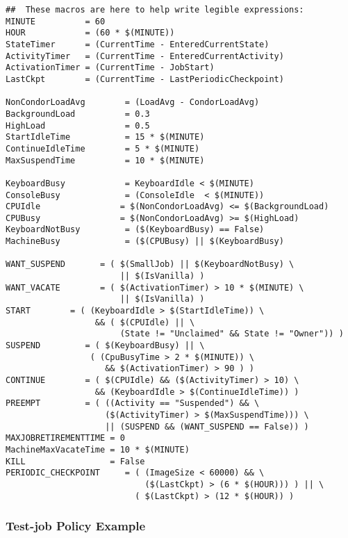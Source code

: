 \begin{verbatim}
##  These macros are here to help write legible expressions:
MINUTE          = 60
HOUR            = (60 * $(MINUTE))
StateTimer      = (CurrentTime - EnteredCurrentState)
ActivityTimer   = (CurrentTime - EnteredCurrentActivity)
ActivationTimer = (CurrentTime - JobStart)
LastCkpt        = (CurrentTime - LastPeriodicCheckpoint)

NonCondorLoadAvg        = (LoadAvg - CondorLoadAvg)
BackgroundLoad          = 0.3
HighLoad                = 0.5
StartIdleTime           = 15 * $(MINUTE)
ContinueIdleTime        = 5 * $(MINUTE)
MaxSuspendTime          = 10 * $(MINUTE)

KeyboardBusy            = KeyboardIdle < $(MINUTE)
ConsoleBusy             = (ConsoleIdle  < $(MINUTE))
CPUIdle                = $(NonCondorLoadAvg) <= $(BackgroundLoad)
CPUBusy                = $(NonCondorLoadAvg) >= $(HighLoad)
KeyboardNotBusy         = ($(KeyboardBusy) == False)
MachineBusy             = ($(CPUBusy) || $(KeyboardBusy)

WANT_SUSPEND       = ( $(SmallJob) || $(KeyboardNotBusy) \
                       || $(IsVanilla) )
WANT_VACATE        = ( $(ActivationTimer) > 10 * $(MINUTE) \
                       || $(IsVanilla) )
START        = ( (KeyboardIdle > $(StartIdleTime)) \
                  && ( $(CPUIdle) || \
                       (State != "Unclaimed" && State != "Owner")) )
SUSPEND         = ( $(KeyboardBusy) || \
                 ( (CpuBusyTime > 2 * $(MINUTE)) \
                    && $(ActivationTimer) > 90 ) )
CONTINUE        = ( $(CPUIdle) && ($(ActivityTimer) > 10) \
                  && (KeyboardIdle > $(ContinueIdleTime)) )
PREEMPT	        = ( ((Activity == "Suspended") && \
                    ($(ActivityTimer) > $(MaxSuspendTime))) \
                    || (SUSPEND && (WANT_SUSPEND == False)) )
MAXJOBRETIREMENTTIME = 0
MachineMaxVacateTime = 10 * $(MINUTE)
KILL                 = False
PERIODIC_CHECKPOINT     = ( (ImageSize < 60000) && \
                            ($(LastCkpt) > (6 * $(HOUR))) ) || \ 
                          ( $(LastCkpt) > (12 * $(HOUR)) )
\end{verbatim}

\subsubsection{\label{sec:Test-job Policy Example}
Test-job Policy Example}

